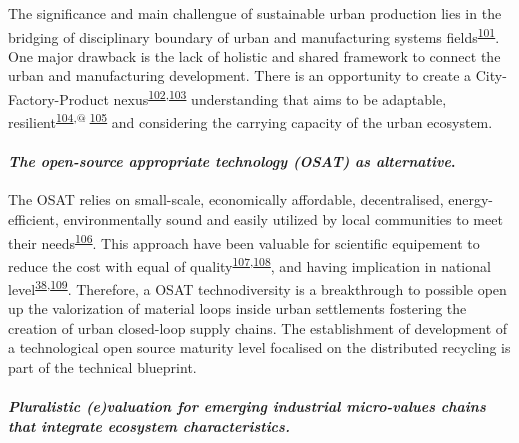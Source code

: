 \documentclass[
  11pt,
  a4paperpaper,
  onecolumn]{article}
\let\oldparagraph\paragraph
\renewcommand{\paragraph}[1]{\oldparagraph{#1}\mbox{}}
\let\paragraph\oldparagraph
\begin{document}
The significance and main challengue of sustainable urban production
lies in the bridging of disciplinary boundary of urban and manufacturing
systems fields\textsuperscript{\protect\hyperlink{ref-Tsui2020}{101}}.
One major drawback is the lack of holistic and shared framework to
connect the urban and manufacturing development. There is an opportunity
to create a City-Factory-Product
nexus\textsuperscript{\protect\hyperlink{ref-herrmann2019}{102},\protect\hyperlink{ref-williams2019}{103}}
understanding that aims to be adaptable,
resilient\textsuperscript{\protect\hyperlink{ref-Shabbir2021}{104},@
\protect\hyperlink{ref-mubarik2021}{105}} and considering the carrying
capacity of the urban ecosystem.

\hypertarget{the-open-source-appropriate-technology-osat-as-alternative.}{%
\paragraph{\texorpdfstring{\emph{The open-source appropriate technology
(OSAT) as
alternative}.}{The open-source appropriate technology (OSAT) as alternative.}}\label{the-open-source-appropriate-technology-osat-as-alternative.}}

The OSAT relies on small-scale, economically affordable, decentralised,
energy-efficient, environmentally sound and easily utilized by local
communities to meet their
needs\textsuperscript{\protect\hyperlink{ref-Pearce2012b}{106}}. This
approach have been valuable for scientific equipement to reduce the cost
with equal of
quality\textsuperscript{\protect\hyperlink{ref-Pearce2014k}{107},\protect\hyperlink{ref-Pearce2016}{108}},
and having implication in national
level\textsuperscript{\protect\hyperlink{ref-Heikkinen2020a}{38},\protect\hyperlink{ref-pearce2022a}{109}}.
Therefore, a OSAT technodiversity is a breakthrough to possible open up
the valorization of material loops inside urban settlements fostering
the creation of urban closed-loop supply chains. The establishment of
development of a technological open source maturity level focalised on
the distributed recycling is part of the technical blueprint.

\hypertarget{pluralistic-evaluation-for-emerging-industrial-micro-values-chains-that-integrate-ecosystem-characteristics.}{%
\paragraph{\texorpdfstring{\emph{Pluralistic (e)valuation for emerging
industrial micro-values chains that integrate ecosystem
characteristics.}}{Pluralistic (e)valuation for emerging industrial micro-values chains that integrate ecosystem characteristics.}}\label{pluralistic-evaluation-for-emerging-industrial-micro-values-chains-that-integrate-ecosystem-characteristics.}}
\end{document}
